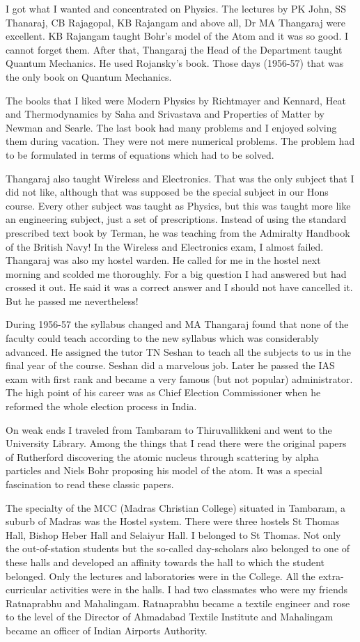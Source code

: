 I got what I wanted and concentrated on Physics. The lectures by PK 
John, SS Thanaraj, CB Rajagopal, KB Rajangam and above all, Dr MA 
Thangaraj were excellent. KB Rajangam taught Bohr's model of the Atom 
and it was so good. I cannot forget them. After that, Thangaraj the Head 
of the Department taught Quantum Mechanics. He used Rojansky's book. 
Those days (1956-57) that was the only book on Quantum Mechanics.

The books that I liked were Modern Physics by Richtmayer and Kennard, 
Heat and Thermodynamics by Saha and Srivastava and Properties of Matter 
by Newman and Searle. The last book had many problems and I enjoyed 
solving them during vacation. They were not mere numerical problems. The 
problem had to be formulated in terms of equations which had to be 
solved.

Thangaraj also taught Wireless and Electronics. That was the only 
subject that I did not like, although that was supposed be the special 
subject in our Hons course. Every other subject was taught as Physics, 
but this was taught more like an engineering subject, just a set of 
prescriptions. Instead of using the standard prescribed text book by 
Terman, he was teaching from the Admiralty Handbook of the British Navy! 
In the Wireless and Electronics exam, I almost failed. Thangaraj was 
also my hostel warden. He called for me in the hostel next morning and 
scolded me thoroughly. For a big question I had answered but had crossed 
it out. He said it was a correct answer and I should not have cancelled 
it. But he passed me nevertheless!

During 1956-57 the syllabus changed and MA Thangaraj found that none of 
the faculty could teach according to the new syllabus which was 
considerably advanced. He assigned the tutor TN Seshan to teach all the 
subjects to us in the final year of the course. Seshan did a marvelous 
job. Later he passed the IAS exam with first rank and became a very 
famous (but not popular) administrator. The high point of his career was 
as Chief Election Commissioner when he reformed the whole election 
process in India.

On weak ends I traveled from Tambaram to Thiruvallikkeni and went to 
the University Library. Among the things that I read there were the 
original papers of Rutherford discovering the atomic nucleus through 
scattering by alpha particles and Niels Bohr proposing his model of the 
atom. It was a special fascination to read these classic papers.
 
The specialty of the MCC (Madras Christian College) situated in 
Tambaram, a suburb of Madras was the Hostel system. There were three 
hostels St Thomas Hall, Bishop Heber Hall and Selaiyur Hall. I belonged 
to St Thomas. Not only the out-of-station students but the so-called 
day-scholars also belonged to one of these halls and developed an 
affinity towards the hall to which the student belonged. Only the 
lectures and laboratories were in the College. All the extra-curricular 
activities were in the halls. I had two classmates who were my friends 
Ratnaprabhu and Mahalingam. Ratnaprabhu became a textile engineer and 
rose to the level of the Director of Ahmadabad Textile Institute and 
Mahalingam became an officer of Indian Airports Authority.

